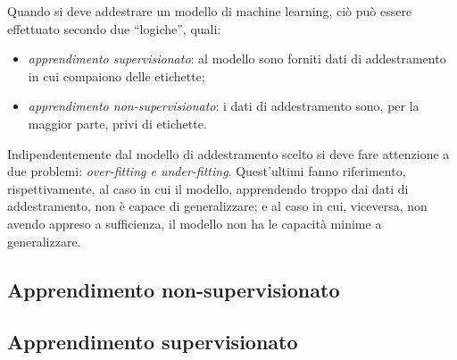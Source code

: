 \documentclass{subfiles}
\begin{document}
Quando si deve addestrare un modello di machine learning, ciò può essere effettuato secondo due ``logiche'', quali:
\begin{itemize}
    \item \emph{apprendimento supervisionato}: al modello sono forniti dati di addestramento in cui compaiono delle etichette\footnotemark[1];
    \item \emph{apprendimento non-supervisionato}: i dati di addestramento sono, per la maggior parte, privi di etichette.
\end{itemize}

Indipendentemente dal modello di addestramento scelto si deve fare attenzione a due problemi: \emph{over-fitting \emph{e} under-fitting}.
Quest'ultimi fanno riferimento, rispettivamente, al caso in cui il modello, apprendendo troppo dai dati di addestramento,
non è capace di generalizzare; e al caso in cui, viceversa, non avendo appreso a sufficienza, il modello non ha le capacità minime a generalizzare.

\subsection{Apprendimento non-supervisionato}


\subsection{Apprendimento supervisionato}

\clearpage
\end{document}
